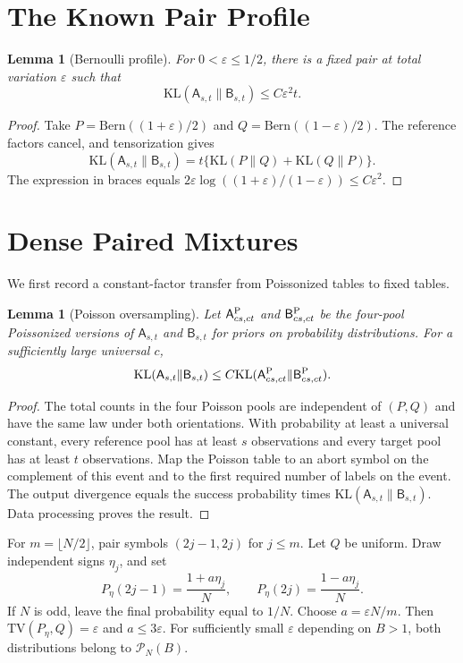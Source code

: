 \documentclass{article}
\newtheorem{lemma}[theorem]{Lemma}
\newcommand{\KL}{\mathrm{KL}}
\newcommand{\TV}{\mathrm{TV}}
\newcommand{\Ber}{\mathrm{Bern}}
\newcommand{\cP}{\mathcal P}
\newcommand{\cA}{\mathsf A}
\newcommand{\cB}{\mathsf B}
\begin{document}
\section{The Known Pair Profile}

\begin{lemma}[Bernoulli profile]
\label{lem:bernoulli-profile}
For $0<\varepsilon\leq1/2$, there is a fixed pair at total variation $\varepsilon$ such that
\[
\KL(\cA_{s,t}\|\cB_{s,t})\leq C\varepsilon^2t.
\]
\end{lemma}

\begin{proof}
Take $P=\Ber((1+\varepsilon)/2)$ and $Q=\Ber((1-\varepsilon)/2)$. The reference factors cancel, and tensorization gives
\[
\KL(\cA_{s,t}\|\cB_{s,t})
=t\{\KL(P\|Q)+\KL(Q\|P)\}.
\]
The expression in braces equals $2\varepsilon\log((1+\varepsilon)/(1-\varepsilon))\leq C\varepsilon^2$.
\end{proof}

\section{Dense Paired Mixtures}

We first record a constant-factor transfer from Poissonized tables to fixed tables.

\begin{lemma}[Poisson oversampling]
\label{lem:depoisson}
Let $\cA^{\rm P}_{cs,ct}$ and $\cB^{\rm P}_{cs,ct}$ be the four-pool Poissonized versions of $\cA_{s,t}$ and $\cB_{s,t}$ for priors on probability distributions. For a sufficiently large universal $c$,
\[
\KL(\cA_{s,t}\|\cB_{s,t})\leq C\KL(\cA^{\rm P}_{cs,ct}\|\cB^{\rm P}_{cs,ct}).
\]
\end{lemma}

\begin{proof}
The total counts in the four Poisson pools are independent of $(P,Q)$ and have the same law under both orientations. With probability at least a universal constant, every reference pool has at least $s$ observations and every target pool has at least $t$ observations. Map the Poisson table to an abort symbol on the complement of this event and to the first required number of labels on the event. The output divergence equals the success probability times $\KL(\cA_{s,t}\|\cB_{s,t})$. Data processing proves the result.
\end{proof}

For $m=\lfloor N/2\rfloor$, pair symbols $(2j-1,2j)$ for $j\leq m$. Let $Q$ be uniform. Draw independent signs $\eta_j$, and set
\[
P_\eta(2j-1)=\frac{1+a\eta_j}{N},\qquad
P_\eta(2j)=\frac{1-a\eta_j}{N}.
\]
If $N$ is odd, leave the final probability equal to $1/N$. Choose $a=\varepsilon N/m$. Then $\TV(P_\eta,Q)=\varepsilon$ and $a\leq3\varepsilon$. For sufficiently small $\varepsilon$ depending on $B>1$, both distributions belong to $\cP_N(B)$.
\end{document}
